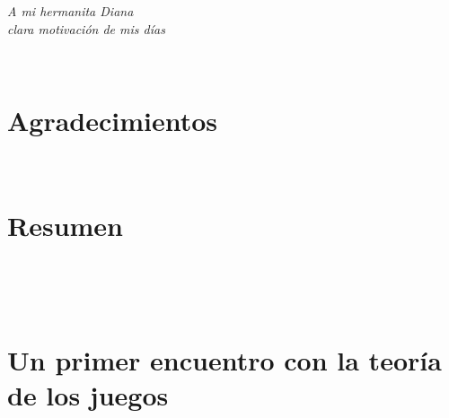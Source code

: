\documentclass[12pt]{book}
\begin{document}
\begin{flushright}
\textit{ A mi hermanita Diana\\
clara motivación de mis días}
\end{flushright}
\newpage
$\ $
\thispagestyle{empty} %

\chapter*{Agradecimientos} %
 

\newpage

$\ $
\thispagestyle{empty} %

\chapter*{Resumen} %


\newpage
$\ $
\thispagestyle{empty} %

\tableofcontents %
\newpage
$\ $
\thispagestyle{empty} %

\cleardoublepage
{} %


\chapter{Un primer encuentro con la teoría de los juegos}\label{cap.introduccion}





\newpage
\end{document}
